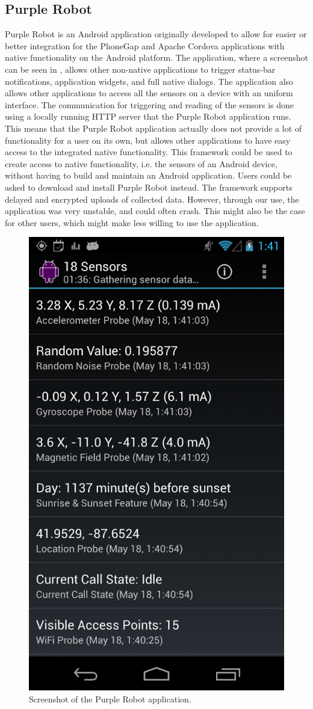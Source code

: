 \subsection{Purple Robot}
\label{sub:purple_robot}


Purple Robot \parencite{purple_robot} is an Android application originally developed to allow for easier or better integration for the PhoneGap and Apache Cordova applications with native functionality on the Android platform. The application, where a screenshot can be seen in , allows other non-native applications to trigger status-bar notifications, application widgets, and full native dialogs. The application also allows other applications to access all the sensors on a device with an uniform interface. The communication for triggering and reading of the sensors is done using a locally running HTTP server that the Purple Robot application runs. This means that the Purple Robot application actually does not provide a lot of functionality for a user on its own, but allows other applications to have easy access to the integrated native functionality. This framework could be used to create access to native functionality, i.e. the sensors of an Android device, without having to build and maintain an Android application. Users could be asked to download and install Purple Robot instead. The framework supports delayed and encrypted uploads of collected data. However, through our use, the application was very unstable, and could often crash. This might also be the case for other users, which might make less willing to use the application.

\begin{figure}[!htbp]
	\centering
	\includegraphics[height=0.5\textwidth]{graphic/existing_solutions/purple_robot.png}
	\caption[]{Screenshot of the Purple Robot application\footnotemark.}
	\label{fig:purple_robot_screenshot}
\end{figure}
\FloatBarrier
{}

